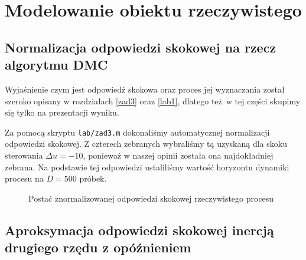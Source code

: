 \chapter{Modelowanie obiektu rzeczywistego}
\label{lab3}

\section{Normalizacja odpowiedzi skokowej na rzecz algorytmu DMC}
\label{lab3_norm}
Wyjaśnienie czym jest odpowiedź skokowa oraz proces jej wyznaczania został 
szeroko opisany w rozdziałach \ref{zad3} oraz \ref{lab1}, dlatego też w tej części 
skupimy się tylko na prezentacji wyniku.

Za pomocą skryptu \verb+lab/zad3.m+ dokonaliśmy automatycznej normalizacji odpowiedzi skokowej.
Z czterech zebranych wybraliśmy tą uzyskaną dla skoku sterowania $\Delta u = \num{-10}$, ponieważ 
w naszej opinii została ona najdokładniej zebrana. Na podstawie tej odpowiedzi ustaliliśmy wartość
horyzontu dynamiki procesu na $D = \num{500}$ próbek.

\begin{figure}[b]
    \label{zad3_norm_odp}
    \centering
    \caption{Postać znormalizowanej odpowiedzi skokowej rzeczywistego procesu}
\end{figure}
\FloatBarrier

\section{Aproksymacja odpowiedzi skokowej inercją drugiego rzędu z opóźnieniem}
\label{lab3_modelowanie}

